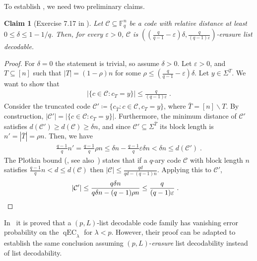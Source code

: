 \documentclass{article}
\newcommand{\eps}{\varepsilon}
\DeclareMathOperator{\qEC}{qEC}
\newcommand{\cC}{\mathcal{C}}
\newcommand{\bF}{\mathbb{F}}
\theoremstyle{plain}
\theoremstyle{plain}
\theoremstyle{plain}
\theoremstyle{plain}
\theoremstyle{plain}
\theoremstyle{plain}
\newtheorem{claim}[definition]{Claim}%
\theoremstyle{plain}
\theoremstyle{plain}
\theoremstyle{plain}
\theoremstyle{plain}
\theoremstyle{remark}
\theoremstyle{remark}
\theoremstyle{remark}
\theoremstyle{plain}
\begin{document}
To establish , we need two preliminary claims.
\begin{claim}[Exercise 7.17 in \cite{guruswami2012essential}] \label{clm:erasure_list_decocable} Let $\cC\subseteq\bF^n_q$ be a code with relative distance at least $0\le \delta\le 1-1/q$. Then, for every $\varepsilon>0$, $\cC$ is $\left(\left(\frac{q}{q-1}-\varepsilon\right)\delta,\frac{q}{(q-1)\varepsilon}\right)$-erasure list decodable.
\end{claim} 
\begin{proof}
For $\delta=0$ the statement is trivial, so assume $\delta>0$.
Let $\varepsilon>0$, and $T\subseteq [n]$ such that
    $|T|=(1-\rho)n$ for some $\rho\le \left(\frac{q}{q-1}-\eps\right)\delta$. Let $y\in\Sigma^T$. We 
    want to show that 
    \begin{align*}
        \big|\{c\in \cC:c_T=y\}\big|\le\frac{q}{(q-1)\varepsilon}\;.
    \end{align*} 
    Consider the truncated code $\cC'\coloneqq \{c_{\bar{T}}: c\in\cC, c_T=y\}$, where $\bar{T}=[n]\backslash T$. By construction, $|\cC'|=|\{c\in \cC:c_T=y\}|$. Furthermore, the minimum distance 
    of $\cC'$ satisfies $d(\cC')\ge d(\cC)\ge\delta n$, and since
    $\cC'\subseteq\Sigma^{\bar{T}}$ its block length is $n'=|\bar{T}|=\rho n$. Then, we have 
    \begin{align*}
        \frac{q-1}{q}n'
        =\frac{q-1}{q}\rho n\le
        \delta n-\frac{q-1}{q}\eps\delta n
        <\delta n\le d(\cC')\;.
    \end{align*}
The Plotkin bound (\cite{Plo60}, see also~\cite[Theorem 4.4.1]{guruswami2012essential})
states that if a $q$-ary code $\cC$ with block length $n$ 
satisfies $\frac{q-1}{q}n<d\le d(\cC)$
then $|\cC|\le\frac{qd}{qd-(q-1)n}$. Applying this to $\cC'$,
   \begin{align*}
       |\cC'|&\le\frac{q\delta n}{q\delta n-(q-1)\rho n}\le \frac{q}{(q-1)\varepsilon}\;.\qedhere
   \end{align*}
\end{proof}

In~\cite{pernice2025list} it is proved that a 
$(p,L)$-list decodable code family has vanishing error
probability on the $\qEC_\lambda$ for $\lambda<p$. However,
their proof can be adapted to establish the same conclusion
assuming $(p,L)$-\emph{erasure} list decodability instead of
list decodability.
\end{document}
